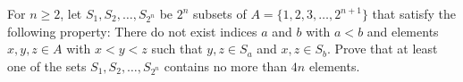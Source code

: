 For $n \geq 2$, let $S_1, S_2, \ldots, S_{2^n}$ be $2^n$ subsets of $A = \{1, 2, 3, \ldots, 2^{n+1}\}$ that satisfy the following property: There do not exist indices $a$ and $b$ with $a < b$ and elements $x, y, z \in A$ with $x < y < z$ such that $y, z \in S_a$ and $x, z \in S_b$. Prove that at least one of the sets $S_1, S_2, \ldots, S_{2^n}$ contains no more than $4n$ elements.
